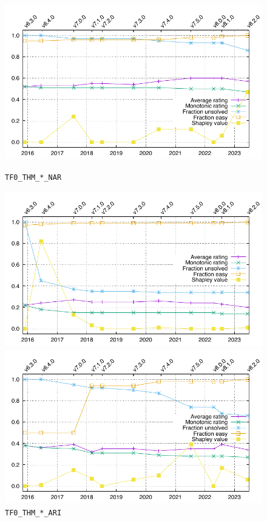 \documentclass[runningheads]{llncs}
\begin{document}
\begin{figure}[t!]
\centering
\begin{minipage}[t]{.49\textwidth}
  \centering
  \includegraphics[width=\textwidth]{Plots/GNUPlots/TF0_THM_NAR.pdf}
  \vspace*{-2em}
  \caption{{\tt TF0\_THM\_*\_NAR}}
  \label{Plot_TF0_THM_NAR}
\end{minipage}
\begin{minipage}[t]{.49\textwidth}
  \centering
  \includegraphics[width=\textwidth]{Plots/GNUPlots/TF0_THM_ARI.pdf}
  \vspace*{-2em}
  \caption{{\tt TF0\_THM\_*\_ARI}}
  \label{Plot_TF0_THM_ARI}
\end{minipage}
\begin{minipage}[t]{.49\textwidth}
  \centering
  \includegraphics[width=\textwidth]{Plots/GNUPlots/TH0_THM_NAR.pdf}

\end{minipage}
\end{figure}
\end{document}
